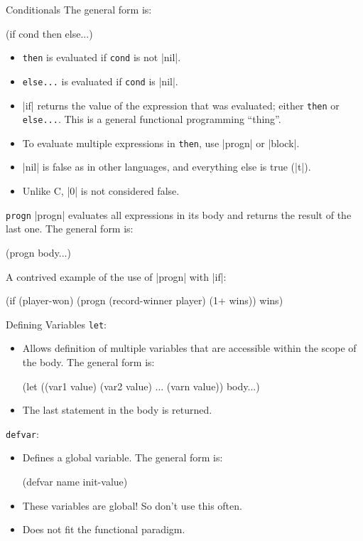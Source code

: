 \documentclass{beamer}
\begin{document}

\begin{frame}[fragile]{Conditionals}
  The general form is:
  \begin{clcode}
    (if cond then else...)
  \end{clcode}
  \begin{itemize}
  \item \texttt{then} is evaluated if \texttt{cond} is not \cl|nil|.
  \item \texttt{else...} is evaluated if \texttt{cond} is \cl|nil|.
  \item \cl|if| returns the value of the expression that was evaluated; either \texttt{then} or \texttt{else...}. This is a general functional programming ``thing''.
  \item To evaluate multiple expressions in \texttt{then}, use \cl|progn| or \cl|block|.
  \item \cl|nil| is false as in other languages, and everything else is true (\cl|t|).
  \item Unlike C, \cl|0| is not considered false.
  \end{itemize}
\end{frame}

\begin{frame}[fragile]{\texttt{progn}}
  \cl|progn| evaluates all expressions in its body and returns the result of the last one. The general form is:
  \begin{clcode}
    (progn body...)
  \end{clcode}
A contrived example of the use of \cl|progn| with \cl|if|:
\begin{clcode}
(if (player-won)
  (progn
    (record-winner player)
    (1+ wins))
  wins)
\end{clcode}
\end{frame}

\begin{frame}[fragile]{Defining Variables}
\texttt{let}:
\begin{itemize}
\item Allows definition of multiple variables that are accessible
  within the scope of the body. The general form is:
\begin{clcode}
(let ((var1 value) (var2 value) ... (varn value)) body...)
\end{clcode}
\item The last statement in the body is returned.
\end{itemize}
\texttt{defvar}:
\begin{itemize}
\item Defines a global variable. The general form is:
  \begin{clcode}
    (defvar name init-value)
  \end{clcode}
\item These variables are global! So don't use this often.
\item Does not fit the functional paradigm.
\end{itemize}
\end{frame}
\end{document}
